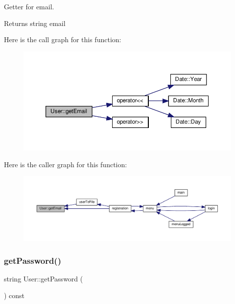 Getter for email. \begin{DoxyReturn}{Returns}
string email 
\end{DoxyReturn}
Here is the call graph for this function\+:\nopagebreak
\begin{figure}[H]
\begin{center}
\leavevmode
\includegraphics[width=350pt]{class_user_a4c647e583bd964f40f687776a0d185dc_cgraph}
\end{center}
\end{figure}
Here is the caller graph for this function\+:\nopagebreak
\begin{figure}[H]
\begin{center}
\leavevmode
\includegraphics[width=350pt]{class_user_a4c647e583bd964f40f687776a0d185dc_icgraph}
\end{center}
\end{figure}
\mbox{\label{class_user_a33429bdd1253091697a9c5c5e1448bee}} 
\subsubsection{\texorpdfstring{get\+Password()}{getPassword()}}
{\footnotesize\ttfamily string User\+::get\+Password (\begin{DoxyParamCaption}{ }\end{DoxyParamCaption}) const\hspace{0.3cm}{\ttfamily [inline]}}

